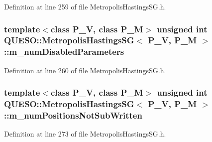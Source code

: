 Definition at line 259 of file Metropolis\-Hastings\-S\-G.\-h.

\hypertarget{class_q_u_e_s_o_1_1_metropolis_hastings_s_g_a43a883aa28c81ed99e5f0cd9de93889b}{
\subsubsection[{m\-\_\-num\-Disabled\-Parameters}]{\setlength{\rightskip}{0pt plus 5cm}template$<$class P\-\_\-\-V, class P\-\_\-\-M$>$ unsigned int {\bf Q\-U\-E\-S\-O\-::\-Metropolis\-Hastings\-S\-G}$<$ P\-\_\-\-V, P\-\_\-\-M $>$\-::m\-\_\-num\-Disabled\-Parameters\hspace{0.3cm}{\ttfamily [private]}}}\label{class_q_u_e_s_o_1_1_metropolis_hastings_s_g_a43a883aa28c81ed99e5f0cd9de93889b}


Definition at line 260 of file Metropolis\-Hastings\-S\-G.\-h.

\hypertarget{class_q_u_e_s_o_1_1_metropolis_hastings_s_g_a60695940f442f6568d10ee9e456032c7}{
\subsubsection[{m\-\_\-num\-Positions\-Not\-Sub\-Written}]{\setlength{\rightskip}{0pt plus 5cm}template$<$class P\-\_\-\-V, class P\-\_\-\-M$>$ unsigned int {\bf Q\-U\-E\-S\-O\-::\-Metropolis\-Hastings\-S\-G}$<$ P\-\_\-\-V, P\-\_\-\-M $>$\-::m\-\_\-num\-Positions\-Not\-Sub\-Written\hspace{0.3cm}{\ttfamily [private]}}}\label{class_q_u_e_s_o_1_1_metropolis_hastings_s_g_a60695940f442f6568d10ee9e456032c7}


Definition at line 273 of file Metropolis\-Hastings\-S\-G.\-h.

